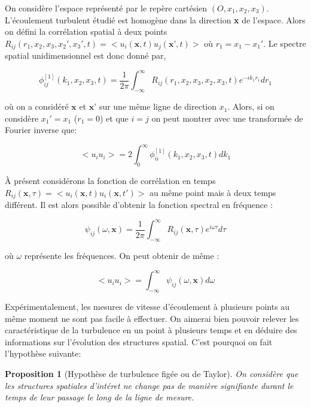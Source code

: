 \documentclass[12pt]{article}
\theoremstyle{plain}
\newtheorem{proposition}[theorem]{Proposition}
\theoremstyle{remark}
\begin{document}
		On considère l'espace représenté par le repère cartésien $(O,x_1,x_2,x_3)$. L'écoulement turbulent étudié est homogène dans la direction \textbf{x} de l'espace. Alors on défini la corrélation spatial à deux points \\$R_{ij}(r_1, x_2,x_3,x_2',x_3',t) = <u_i(\textbf{x},t)u_j(\textbf{x'},t)>$ où $r_1=x_1-x_1'$. Le spectre spatial unidimensionnel est donc donné par,
		
		\begin{equation}
			\phi_{ij}^{[1]}(k_1,x_2,x_3,t)=\frac{1}{2\pi}\int_{-\infty}^{\infty}R_{ij}(r_1,x_2,x_3,x_2,x_3,t)e^{-ik_1r_1}dr_1
		\end{equation}
	
		où on a considéré $\textbf{x}$ et $\textbf{x'}$ sur une même ligne de direction $x_1$. Alors, si on considère $x_1'=x_1$ ($r_1=0$) et que $i=j$ on peut montrer avec une transformée de Fourier inverse que:
		
		\begin{equation}
			<u_iu_i>=2\int_{0}^{\infty}\phi_{ii}^{[1]}(k_1,x_2,x_3,t)dk_1
		\end{equation}
	
		À présent considérons la fonction de corrélation en temps $R_{ij}(\textbf{x},\tau)=<u_i(\textbf{x},t)u_i(\textbf{x},t')>$ au même point mais à deux temps différent. Il est alors possible d'obtenir la fonction spectral en fréquence :
		
		\begin{equation}
			\psi_{ij}(\omega,\textbf{x})=\frac{1}{2\pi}\int_{-\infty}^{\infty}R_{ij}(\textbf{x},\tau)e^{i\omega\tau}d\tau
		\end{equation}
	
		où $\omega$ représente les fréquences. On peut obtenir de même : 
		
		\begin{equation}
			<u_iu_i>=\int_{-\infty}^{\infty}\psi_{ij}(\omega,\textbf{x})d\omega
		\end{equation}
		
		
		Expérimentalement, les mesures de vitesse d'écoulement à plusieurs points au même moment ne sont pas facile à effectuer. On aimerai bien pouvoir relever les caractéristique de la turbulence en un point à plusieurs temps et en déduire des informations sur l'évolution des structures spatial. C'est pourquoi on fait l'hypothèse suivante:
		
		\begin{proposition}[Hypothèse de turbulence figée ou de Taylor]
			On considère que les structures spatiales d'intéret ne change pas de manière signifiante durant le temps de leur passage le long de la ligne de mesure. 
			\label{prop:turb-fig}
		\end{proposition}
	
\end{document}
